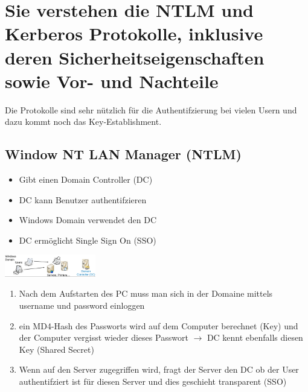 \documentclass{report}
\newenvironment{Figure}
	{\par\medskip\noindent\minipage{\linewidth}}
	{\endminipage\par\medskip}
\theoremstyle{definition}
\theoremstyle{example}
\begin{document}
\section{Sie verstehen die NTLM und Kerberos Protokolle, inklusive deren Sicherheitseigenschaften sowie Vor- und Nachteile}
Die Protokolle sind sehr nützlich für die Authentifzierung bei vielen Usern und dazu kommt noch das Key-Establishment.

	\subsection{Window NT LAN Manager (NTLM)}
\begin{itemize}
	\item Gibt einen Domain Controller (DC)
	\item DC kann Benutzer authentifzieren
	\item Windows Domain verwendet den DC
	\item DC ermöglicht Single Sign On (SSO)
\end{itemize}
\begin{Figure}
\centering
\includegraphics[width=150px]{img/DC.png}
	\label{fig:Abbildung des Schemas für einen Domain Controller}
\end{Figure}

\begin{enumerate}
	\item Nach dem Aufstarten des PC muss man sich in der Domaine mittels username und password einloggen
	\item ein MD4-Hash des Passworts wird auf dem Computer berechnet (Key) und der Computer vergisst wieder dieses Passwort $\rightarrow$ DC kennt ebenfalls diesen Key (Shared Secret)
	\item Wenn auf den Server zugegriffen wird, fragt der Server den DC ob der User authentifziert ist für diesen Server und dies geschieht transparent (SSO)
\end{enumerate}
\end{document}
